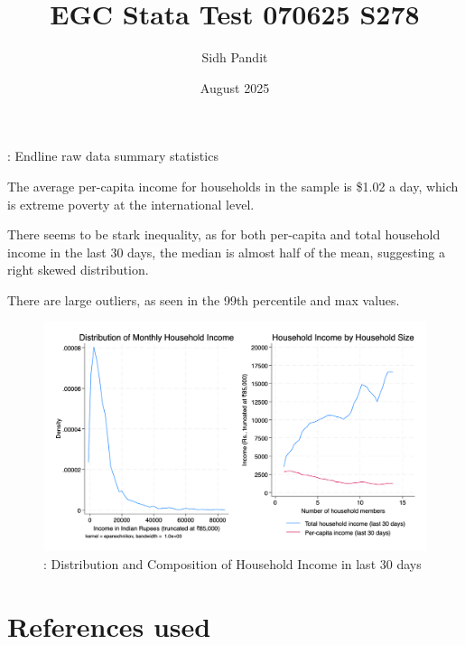 \documentclass[12pt]{article}
\title{EGC Stata Test 070625 S278}
\author{Sidh Pandit}
\date{August 2025}
\begin{document}
\maketitle

\begin{table}[H]
    \centering
    \scriptsize %
    \setlength{\tabcolsep}{2pt}
    \renewcommand{\arraystretch}{2}
    \resizebox{\textwidth}{!}{}
    \caption{: Endline raw data summary statistics}
\end{table}


The average per-capita income for households in the sample is \$1.02 a day, which is extreme poverty at the international level. 

There seems to be stark inequality, as for both per-capita and total household income in the last 30 days, the median is almost half of the mean, suggesting a right skewed distribution.


There are large outliers, as seen in the 99th percentile and max values.


\begin{figure}[H]
    \centering
    \includegraphics[width=\textwidth]{figures/figure01_hhinc.png}
    \caption{: Distribution and Composition of Household Income in last 30 days}
\end{figure}







\section{References used}
\end{document}
